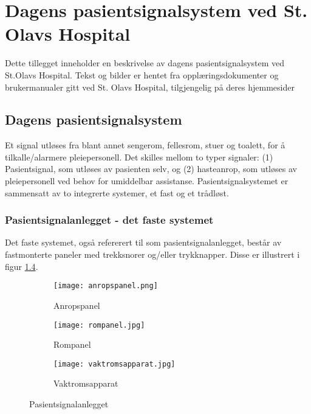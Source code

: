 \chapter{Dagens pasientsignalsystem ved St. Olavs Hospital}
\label{appendix_dagenssystem}
Dette tillegget inneholder en beskrivelse av dagens pasientsignalsystem ved St.Olavs Hospital. Tekst og bilder er hentet fra opplæringsdokumenter og brukermanualer gitt ved St. Olavs Hospital, tilgjengelig på deres hjemmesider \cite{BrukerveiledningforPasientsignal, BrukermanualforPasientsignalogPasientsignalapplikasjon, BrukerveiledningforTradlostelefon}

\section{Dagens pasientsignalsystem}
Et signal utløses fra blant annet sengerom, fellesrom, stuer og toalett, for å tilkalle/alarmere pleiepersonell. Det skilles mellom to typer signaler: (1) Pasientsignal, som utløses av pasienten selv, og (2) hasteanrop, som utløses av pleiepersonell ved behov for umiddelbar assistanse. Pasientsignalsystemet er sammensatt av to integrerte systemer, et fast og et trådløst. 

\subsection{Pasientsignalanlegget - det faste systemet}
Det faste systemet, også refererert til som pasientsignalanlegget, består av fastmonterte paneler med trekksnorer og/eller trykknapper. Disse er illustrert i figur \ref{pasientsignalanlegget}.

\begin{figure}[H]
        \centering
        \begin{subfigure}[b]{0.3\textwidth}
        		\centering
                \texttt{[image: anropspanel.png]}
                \caption{Anropspanel}
                \label{anropspanel}
        \end{subfigure}%
        \begin{subfigure}[b]{0.3\textwidth}
        		\centering
                \texttt{[image: rompanel.jpg]}
                \caption{Rompanel}
                \label{rompanel}
        \end{subfigure}
        \begin{subfigure}[b]{0.3\textwidth}
        		\centering
                \texttt{[image: vaktromsapparat.jpg]}
                \caption{Vaktromsapparat}
                \label{vaktromsapparat}
        \end{subfigure}
        \caption{Pasientsignalanlegget}
        \label{pasientsignalanlegget}
\end{figure}


